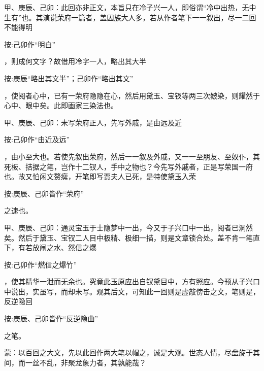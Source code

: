 
\begin{parag}
    \begin{note}甲、庚辰、己卯：此回亦非正文，本旨只在冷子兴一人，即俗谓“冷中出热，无中生有”也。其演说荣府一篇者，盖因族大人多，若从作者笔下一一叙出，尽一二回不能得明\begin{subnote}按:己卯作“明白”\end{subnote}，则成何文字？故借用冷字一人，略出其大半\begin{subnote}按:庚辰“略出其文半”；己卯作“略出其文”\end{subnote}，使阅者心中，已有一荣府隐隐在心，然后用黛玉、宝钗等两三次皴染，则耀然于心中、眼中矣。此即画家三染法也。\end{note}
\end{parag}


\begin{parag}
    \begin{note}甲、庚辰、己卯：未写荣府正人，先写外戚，是由远及近\begin{subnote}按:己卯作“由近及远”\end{subnote}，由小至大也。若使先叙出荣府，然后一一叙及外戚，又一一至朋友、至奴仆，其死板、拮据之笔，岂作十二钗人，手中之物也？今先写外戚者，正是写荣国一府也。故又怕闲文赘瘰，开笔即写贾夫人已死，是特使黛玉入荣\begin{subnote}按:庚辰、己卯皆作“荣府”\end{subnote}之速也。\end{note}
\end{parag}


\begin{parag}
    \begin{note}甲、庚辰、己卯：通灵宝玉于士隐梦中一出，今又于子兴口中一出，阅者已洞然矣。然后于黛玉、宝钗二人目中极精、极细一描，则是文章锁合处。盖不肯一笔直下，有若放闸之水、然信之爆\begin{subnote}按:己卯作“燃信之爆竹”\end{subnote}，使其精华一泄而无余也。究竟此玉原应出自钗黛目中，方有照应。今预从子兴口中说出，实虽写，而却未写。观其后文，可知此一回则是虚敲傍击之文，笔则是，反逆隐回\begin{subnote}按:庚辰、己卯皆作“反逆隐曲”\end{subnote}之笔。\end{note}
\end{parag}


\begin{parag}
    \begin{note}蒙：以百回之大文，先以此回作两大笔以帽之，诚是大观。世态人情，尽盘旋于其间，而一丝不乱，非聚龙象力者，其孰能哉？\end{note}
\end{parag}



